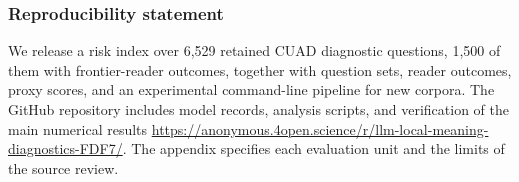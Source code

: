 \subsubsection*{Reproducibility statement}
We release a risk index over 6,529 retained CUAD diagnostic questions, 1,500 of them with frontier-reader outcomes, together with question sets, reader outcomes, proxy scores, and an experimental command-line pipeline for new corpora. The GitHub repository includes model records, analysis scripts, and verification of the main numerical results \url{https://anonymous.4open.science/r/llm-local-meaning-diagnostics-FDF7/}. The appendix specifies each evaluation unit and the limits of the source review.
